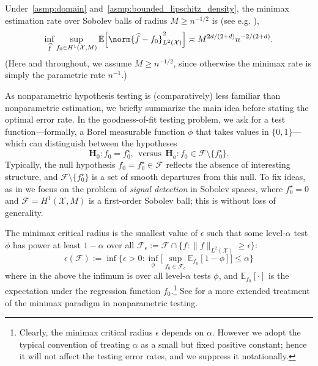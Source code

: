 \documentclass[twoside]{article}
\newcommand{\1}{\mathbf{1}}
\newcommand{\Xset}{\mathcal{X}}
\newcommand{\Leb}{L}
\newcommand{\mc}[1]{\mathcal{#1}}
\newcommand{\Ebb}{\mathbb{E}}
\newcommand{\wh}[1]{\widehat{#1}}
\theoremstyle{definition}
\theoremstyle{remark}
\begin{document}
Under~\ref{asmp:domain} and~\ref{asmp:bounded_lipschitz_density}, the minimax estimation rate over Sobolev balls of radius $M \geq n^{-1/2}$ is (see e.g. \citet{tsybakov2008_book}),
\begin{equation}
\label{eqn:sobolev_space_estimation_minimax_rate}
\inf_{\wh{f}} \sup_{f_0 \in H^1(\Xset, M)} \Ebb\Bigl[\norm{\wh{f} - f_0}_{L^2(\Xset)}^2\Bigr] \asymp M^{2d/(2 + d)}n^{-2/(2 + d)}.
\end{equation}
(Here and throughout, we assume $M \geq n^{-1/2}$, since otherwise the minimax rate is simply the parametric rate $n^{-1}$.)

As nonparametric hypothesis testing is (comparatively) less familiar than nonparametric estimation, we briefly summarize the main idea before stating the optimal error rate. In the goodness-of-fit testing problem, we ask for a test function---formally, a Borel measurable function $\phi$ that takes values in $\{0,1\}$--- which can distinguish between the hypotheses
\begin{equation}
\mathbf{H}_0: f_0 = f_0^{\star}, ~~\textrm{versus}~~ \mathbf{H}_a: f_0 \in \mc{F} \setminus \{f_0^{\star}\}.
\end{equation} 
Typically, the null hypothesis $f_0 = f_0^{\star} \in \mc{F}$ reflects the absence of interesting structure, and $\mc{F} \setminus  \{f_0^{\star}\}$ is a set of smooth departures from this null. To fix ideas, as in \citet{ingster2009} we focus on the problem of \emph{signal detection} in Sobolev spaces, where $f_0^{\star} = 0$ and $\mc{F} = H^1(\Xset,M)$ is a first-order Sobolev ball; this is without loss of generality.

The minimax critical radius is the smallest value of $\epsilon$ such that some level-${\alpha}$ test $\phi$ has power at least $1 - \alpha$ over all $\mc{F}_{\epsilon} := \mc{F} \cap \{f: \|f\|_{\Leb^2(\Xset)} \geq \epsilon\}$:
\begin{equation*}
\epsilon(\mc{F}) := \inf\Biggl\{\epsilon > 0: \inf_{\phi} \biggl[ \sup_{f_0 \in \mc{F}_{\epsilon}} \Ebb_{f_0}[1 - \phi]\biggr] \leq \alpha\Biggr\}
\end{equation*} 
where in the above the infimum is over all level-$\alpha$ tests $\phi$, and $\Ebb_{f_0}[\cdot]$ is the expectation under the regression function $f_0$.\footnote{ Clearly, the minimax critical radius $\epsilon$ depends on $\alpha$. However we adopt the typical convention of treating $\alpha$ as a small but fixed positive constant; hence it will not affect the testing error rates, and we suppress it notationally.} See \citet{ingster82, ingster87, ingster2012} for a more extended treatment of the minimax paradigm in nonparametric testing. 
\end{document}
